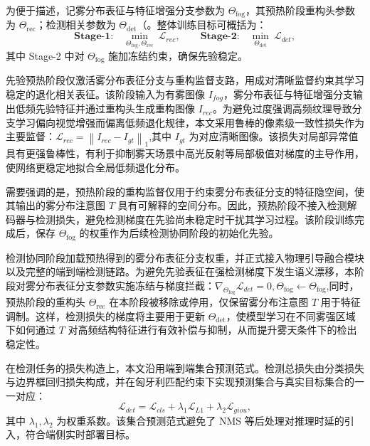 为便于描述，记雾分布表征与特征增强分支参数为 $\Theta_{\text{fog}}$，其预热阶段重构头参数为 $\Theta_{\text{rec}}$；检测相关参数为 $\Theta_{\text{det}}$（。整体训练目标可概括为：
\begin{equation}
\textbf{Stage-1:}\quad \min_{\Theta_{\text{fog}},\Theta_{\text{rec}}}\ \mathcal{L}_{rec},
\qquad
\textbf{Stage-2:}\quad \min_{\Theta_{\text{det}}}\ \mathcal{L}_{det},
\label{eq:two_stage_objective}
\end{equation}
其中 Stage-2 中对 $\Theta_{\text{fog}}$ 施加冻结约束，确保先验稳定。


先验预热阶段仅激活雾分布表征分支与重构监督支路，用成对清晰监督约束其学习稳定的退化相关表征。该阶段输入为有雾图像 $I_{fog}$，雾分布表征与特征增强分支输出低频先验特征并通过重构头生成重构图像 $I_{rec}$。为避免过度强调高频纹理导致分支学习偏向视觉增强而偏离低频退化规律，本文采用鲁棒的像素级一致性损失作为主要监督：$\mathcal{L}_{rec} = \left\|I_{rec}-I_{gt}\right\|_{1}$,其中 $I_{gt}$ 为对应清晰图像。该损失对局部异常值具有更强鲁棒性，有利于抑制雾天场景中高光反射等局部极值对梯度的主导作用，使网络更稳定地拟合全局低频退化分布。

需要强调的是，预热阶段的重构监督仅用于约束雾分布表征分支的特征隐空间，使其输出的雾分布注意图 $T$ 具有可解释的空间分布。因此，预热阶段不接入检测解码器与检测损失，避免检测梯度在先验尚未稳定时干扰其学习过程。该阶段训练完成后，保存 $\Theta_{\text{fog}}$ 的权重作为后续检测协同阶段的初始化先验。

检测协同阶段加载预热得到的雾分布表征分支权重，并正式接入物理引导融合模块以及完整的端到端检测链路。为避免先验表征在强检测梯度下发生语义漂移，本阶段对雾分布表征分支参数实施冻结与梯度拦截：$\nabla_{\Theta_{\text{fog}}}\mathcal{L}_{det}=0,\Theta_{\text{fog}} \leftarrow \Theta_{\text{fog}}$,同时，预热阶段的重构头 $\Theta_{\text{rec}}$ 在本阶段被移除或停用，仅保留雾分布注意图 $T$ 用于特征调制。这样，检测损失的梯度将主要用于更新 $\Theta_{\text{det}}$，使模型学习在不同雾强区域下如何通过 $T$ 对高频结构特征进行有效补偿与抑制，从而提升雾天条件下的检出稳定性。

在检测任务的损失构造上，本文沿用端到端集合预测范式。检测总损失由分类损失与边界框回归损失构成，并在匈牙利匹配约束下实现预测集合与真实目标集合的一一对应：
\begin{equation}
\mathcal{L}_{det} = \mathcal{L}_{cls} + \lambda_{1}\mathcal{L}_{L1} + \lambda_{2}\mathcal{L}_{giou},
\label{eq:det_loss}
\end{equation}
其中 $\lambda_1,\lambda_2$ 为权重系数。该集合预测范式避免了 NMS 等后处理对推理时延的引入，符合端侧实时部署目标。

